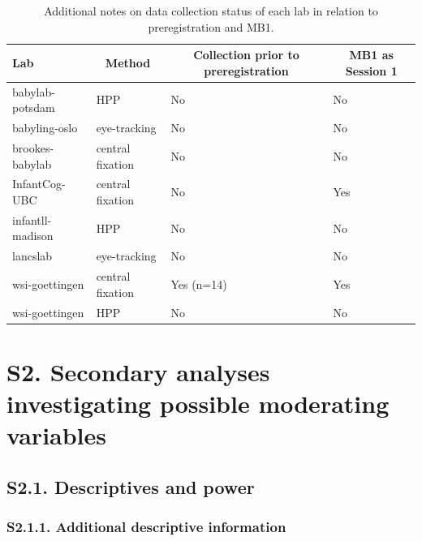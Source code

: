 \documentclass[
  english,
  man, donotrepeattitle,floatsintext]{apa6}
\begin{document}
\begin{table}[tbp]

\begin{center}
\begin{threeparttable}

\caption{\label{tab:unnamed-chunk-1}Additional notes on data collection status of each lab in relation to preregistration and MB1.}

\begin{tabular}{llll}
\toprule
Lab & \multicolumn{1}{c}{Method} & \multicolumn{1}{c}{Collection prior to preregistration} & \multicolumn{1}{c}{MB1 as Session 1}\\
\midrule
babylab-potsdam & HPP & No & No\\
babyling-oslo & eye-tracking & No & No\\
brookes-babylab & central fixation & No & No\\
InfantCog-UBC & central fixation & No & Yes\\
infantll-madison & HPP & No & No\\
lancslab & eye-tracking & No & No\\
wsi-goettingen & central fixation & Yes (n=14) & Yes\\
wsi-goettingen & HPP & No & No\\
\bottomrule
\end{tabular}

\end{threeparttable}
\end{center}

\end{table}

\newpage

\hypertarget{s2.-secondary-analyses-investigating-possible-moderating-variables}{%
\section{S2. Secondary analyses investigating possible moderating variables}\label{s2.-secondary-analyses-investigating-possible-moderating-variables}}

\hypertarget{s2.1.-descriptives-and-power}{%
\subsection{S2.1. Descriptives and power}\label{s2.1.-descriptives-and-power}}

\hypertarget{s2.1.1.-additional-descriptive-information}{%
\subsubsection{S2.1.1. Additional descriptive information}\label{s2.1.1.-additional-descriptive-information}}
\end{document}
